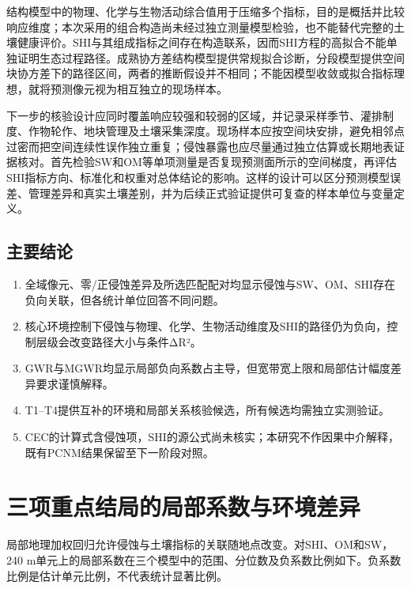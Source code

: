 \documentclass[
  a4paper,
  12pt]{ctexart}
\providecommand{\tightlist}{%
  \setlength{\itemsep}{0pt}\setlength{\parskip}{0pt}}
\begin{document}
结构模型中的物理、化学与生物活动综合值用于压缩多个指标，目的是概括并比较响应维度；本次采用的组合构造尚未经过独立测量模型检验，也不能替代完整的土壤健康评价。SHI与其组成指标之间存在构造联系，因而SHI方程的高拟合不能单独证明生态过程路径。成熟协方差结构模型提供常规拟合诊断，分段模型提供空间块协方差下的路径区间，两者的推断假设并不相同；不能因模型收敛或拟合指标理想，就将预测像元视为相互独立的现场样本。

下一步的核验设计应同时覆盖响应较强和较弱的区域，并记录采样季节、灌排制度、作物轮作、地块管理及土壤采集深度。现场样本应按空间块安排，避免相邻点过密而把空间连续性误作独立重复；侵蚀暴露也应尽量通过独立估算或长期地表证据核对。首先检验SW和OM等单项测量是否复现预测面所示的空间梯度，再评估SHI指标方向、标准化和权重对总体结论的影响。这样的设计可以区分预测模型误差、管理差异和真实土壤差别，并为后续正式验证提供可复查的样本单位与变量定义。

\hypertarget{ux4e3bux8981ux7ed3ux8bba}{%
\subsection{主要结论}\label{ux4e3bux8981ux7ed3ux8bba}}

\begin{enumerate}
\def\labelenumi{\arabic{enumi}.}
\tightlist
\item
  全域像元、零/正侵蚀差异及所选匹配配对均显示侵蚀与SW、OM、SHI存在负向关联，但各统计单位回答不同问题。
\item
  核心环境控制下侵蚀与物理、化学、生物活动维度及SHI的路径仍为负向，控制层级会改变路径大小与条件ΔR²。
\item
  GWR与MGWR均显示局部负向系数占主导，但宽带宽上限和局部估计幅度差异要求谨慎解释。
\item
  T1--T4提供互补的环境和局部关系核验候选，所有候选均需独立实测验证。
\item
  CEC的计算式含侵蚀项，SHI的源公式尚未核实；本研究不作因果中介解释，既有PCNM结果保留至下一阶段对照。
\end{enumerate}

\hypertarget{ux4e09ux9879ux91cdux70b9ux7ed3ux5c40ux7684ux5c40ux90e8ux7cfbux6570ux4e0eux73afux5883ux5deeux5f02}{%
\section{三项重点结局的局部系数与环境差异}\label{ux4e09ux9879ux91cdux70b9ux7ed3ux5c40ux7684ux5c40ux90e8ux7cfbux6570ux4e0eux73afux5883ux5deeux5f02}}

局部地理加权回归允许侵蚀与土壤指标的关联随地点改变。对SHI、OM和SW，240
m单元上的局部系数在三个模型中的范围、分位数及负系数比例如下。负系数比例是估计单元比例，不代表统计显著比例。
\end{document}
